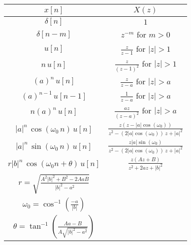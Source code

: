 \documentclass{article}
\begin{document}
\begin{center}
  \begin{tabular}{|c|c|}
    \hline
    $x[n]$ & $X(z)$\\
    \hline
    \hline
    $\delta[n]$ & $1$\\
    $\delta[n - m]$  & $z^{-m}$ for $m > 0$ \\
    $u[n]$  & $\frac{z}{z-1}$ for $|z| > 1$ \\
    $n\, u[n]$  & $\frac{z}{(z-1)^2}$ for $|z| > 1$ \\
    $\left(a\right)^n\, u[n]$  & $\frac{z}{z-a}$ for $|z| > a$ \\
    $\left(a\right)^{n-1}\, u[n-1]$  & $\frac{1}{z-a}$ for $|z| > a$ \\
    $n\left(a\right)^n\, u[n]$  & $\frac{az}{(z-a)^2}$ for $|z| > a$ \\
    $|a|^n\, \cos(\omega_0\, n)\, u[n]$ &  $\frac{z\left(z-|a|\cos(\omega_0)\right)}{z^2 - \left(2|a|\cos(\omega_0)\right)\, z + |a|^2}$\\
    $|a|^n\, \sin(\omega_0\, n)\, u[n]$ &  $\frac{z|a|\sin(\omega_0)}{z^2 - \left(2|a|\cos(\omega_0)\right)\, z + |a|^2}$\\\hline
    $r\left|b\right|^n\, \cos(\omega_0 n + \theta)\, u[n]$  & $\frac{z(Az+B)}{z^2 + 2az+|b|^2}$ \\
    $r = \sqrt{\frac{A^2|b|^2 + B^2 -2AaB}{|b|^2 - a^2}}$ & \\
    $\omega_0 = \cos^{-1}\left( \frac{-a}{|b|}\right)$ & \\
    $\theta = \tan^{-1}\left( \frac{Aa-B}{A\sqrt{|b|^2 -a^2}}\right)$&\\
    \hline
  \end{tabular}
  \egroup
\end{center}
\end{document}
